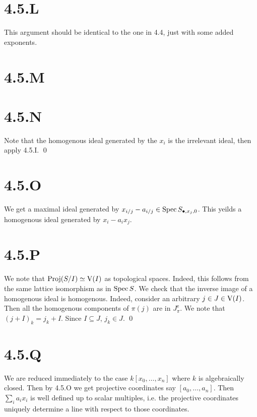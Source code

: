 \documentclass{article}
\begin{document}
\section{4.5.L}
This argument should be identical to the one in 4.4, just with some added exponents.

\section{4.5.M}
\section{4.5.N}
Note that the homogenous ideal generated by the $x_i$ is the irrelevant ideal, then apply 4.5.I. \qed

\section{4.5.O}
We get a maximal ideal generated by $x_{i/j}-a_{i/j} \in \operatorname{Spec} S_{\bullet, x_j, 0}$. This yeilds a homogenous ideal generated by $x_i-a_ix_j$.

\section{4.5.P}
We note that $\operatorname{Proj}(S/I) \simeq \operatorname{V}(I)$ as topological spaces. Indeed, this follows from the same lattice isomorphism as in $\operatorname{Spec} S$. We check that the inverse image of a homogenous ideal is homogenous. Indeed, consider an arbitrary $j \in J \in \operatorname{V}(I)$. Then all the homogenous components of $\pi(j)$ are in $J^{\text{e}}_{\pi}$. We note that $(j+I)_k = j_k+I$. Since $I \subseteq J$, $j_k \in J$. \qed

\section{4.5.Q}
We are reduced immediately to the case $k[x_0,\dots, x_n]$ where $k$ is algebraically closed. Then by 4.5.O we get projective coordinates say $[a_0, \dots, a_n]$. Then $\sum_i a_ix_i$ is well defined up to scalar multiples, i.e. the projective coordinates uniquely determine a line with respect to those coordinates.
\end{document}
